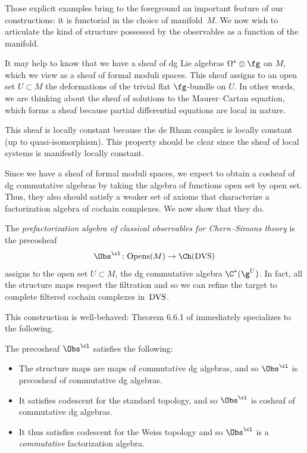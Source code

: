 \documentclass[10pt]{amsart}
\begin{document}
\subsubsection{}

Those explicit examples bring to the foreground an important feature of our constructions:
it is functorial in the choice of manifold~$M$.
We now wish to articulate the kind of structure possessed by the observables as a function of the manifold.

It may help to know that we have a sheaf of dg Lie algebras $\Omega^* \otimes \fg$ on $M$,
which we view as a sheaf of formal moduli spaces.
This sheaf assigns to an open set $U \subset M$ the deformations of the trivial flat $\fg$-bundle on $U$.
In other words, we are thinking about the sheaf of solutions to the Maurer--Cartan equation,
which forms a sheaf because partial differential equations are local in nature.

This sheaf is locally constant because the de Rham complex is locally constant (up to quasi-isomorphism).
This property should be clear since the sheaf of local systems is manifestly locally constant.

Since we have a sheaf of formal moduli spaces, 
we expect to obtain a cosheaf of dg commutative algebras by taking the algebra of functions open set by open set.
Thus, they also should satisfy a weaker set of axioms that characterize a factorization algebra of cochain complexes.
We now show that they do. 

\begin{dfn}
The {\em prefactorization algebra of classical observables for Chern--Simons theory} is the precosheaf
\[
\Obs^{\cl} \colon {\rm Opens}(M) \to \Ch({\rm DVS})
\]
assigns to the open set $U \subset M$, the dg commutative algebra $\C^*(\g^U)$.
In fact, all the structure maps respect the filtration and so we can refine the target to complete filtered cochain complexes in~${\rm DVS}$.
\end{dfn}

This construction is well-behaved:
Theorem 6.6.1 of \cite{CG1} immediately specializes to the following.

\begin{lmm}
The precosheaf $\Obs^\cl$ satisfies the following:
\begin{itemize}
\item The structure maps are maps of commutative dg algebras, and so $\Obs^\cl$ is precosheaf of commutative dg algebras.
\item It satisfies codescent for the standard topology, and so $\Obs^\cl$ is cosheaf of commutative dg algebras.
\item It thus satisfies codescent for the Weiss topology and so $\Obs^\cl$ is a {\em commutative} factorization algebra.
\end{itemize}
\end{lmm}
\end{document}
